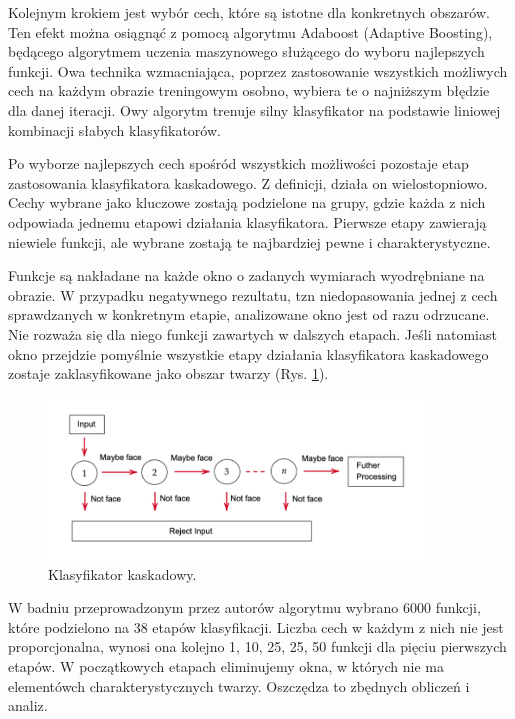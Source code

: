  
 Kolejnym krokiem jest wybór cech, które są istotne dla konkretnych obszarów. Ten efekt można osiągnąć z pomocą algorytmu Adaboost (Adaptive Boosting), będącego algorytmem uczenia maszynowego służącego do wyboru najlepszych funkcji. Owa technika wzmacniająca, poprzez zastosowanie wszystkich możliwych cech na każdym obrazie treningowym osobno, wybiera te o najniższym błędzie dla danej iteracji. Owy algorytm trenuje silny klasyfikator na podstawie liniowej kombinacji słabych klasyfikatorów.%
 
 Po wyborze najlepszych cech spośród wszystkich możliwości pozostaje etap zastosowania klasyfikatora kaskadowego. Z definicji, działa on wielostopniowo. Cechy wybrane jako kluczowe zostają podzielone na grupy, gdzie każda z nich odpowiada jednemu etapowi działania klasyfikatora. Pierwsze etapy zawierają niewiele funkcji, ale wybrane zostają te najbardziej pewne i charakterystyczne. 
 
Funkcje są nakładane na każde okno o zadanych wymiarach wyodrębniane na obrazie. W przypadku negatywnego rezultatu, tzn niedopasowania jednej z cech sprawdzanych w konkretnym etapie, analizowane okno jest od razu odrzucane. Nie rozważa się dla niego funkcji zawartych w dalszych etapach. Jeśli natomiast okno przejdzie pomyślnie wszystkie etapy działania klasyfikatora kaskadowego zostaje zaklasyfikowane jako obszar twarzy (Rys. \ref{fig:cascadeClasificator}).  
 
   \begin{figure}[h]
	\centering
	\includegraphics[width=10cm]{haar_train.png}
	\caption{Klasyfikator kaskadowy. \cite{haarCascade}} 
	\label{fig:cascadeClasificator}
\end{figure}

W badniu przeprowadzonym przez autorów algorytmu wybrano 6000 funkcji, które podzielono na 38 etapów klasyfikacji. Liczba cech w każdym z nich nie jest proporcjonalna, wynosi ona kolejno 1, 10, 25, 25, 50 funkcji dla pięciu pierwszych etapów. W początkowych etapach eliminujemy okna, w których nie ma elementówch charakterystycznych twarzy. Oszczędza to zbędnych obliczeń i analiz.

